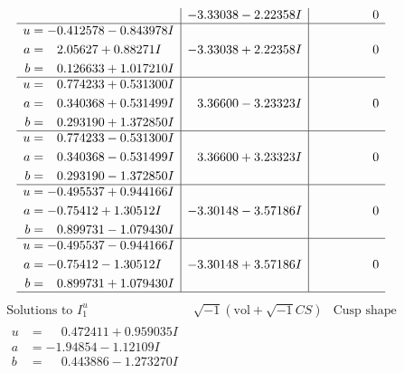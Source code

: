 \documentclass[1p]{elsarticle_modified}
\theoremstyle{definition}
\newcommand{\I}{\sqrt{-1}}
\begin{document}
$$\begin{array}{c|c|c}
 & -3.33038 - 2.22358 I & \phantom{-0.000000 } 0 \\ \hline\begin{aligned}
u &= -0.412578 - 0.843978 I \\
a &= \phantom{-}2.05627 + 0.88271 I \\
b &= \phantom{-}0.126633 + 1.017210 I\end{aligned}
 & -3.33038 + 2.22358 I & \phantom{-0.000000 } 0 \\ \hline\begin{aligned}
u &= \phantom{-}0.774233 + 0.531300 I \\
a &= \phantom{-}0.340368 + 0.531499 I \\
b &= \phantom{-}0.293190 + 1.372850 I\end{aligned}
 & \phantom{-}3.36600 - 3.23323 I & \phantom{-0.000000 } 0 \\ \hline\begin{aligned}
u &= \phantom{-}0.774233 - 0.531300 I \\
a &= \phantom{-}0.340368 - 0.531499 I \\
b &= \phantom{-}0.293190 - 1.372850 I\end{aligned}
 & \phantom{-}3.36600 + 3.23323 I & \phantom{-0.000000 } 0 \\ \hline\begin{aligned}
u &= -0.495537 + 0.944166 I \\
a &= -0.75412 + 1.30512 I \\
b &= \phantom{-}0.899731 - 1.079430 I\end{aligned}
 & -3.30148 - 3.57186 I & \phantom{-0.000000 } 0 \\ \hline\begin{aligned}
u &= -0.495537 - 0.944166 I \\
a &= -0.75412 - 1.30512 I \\
b &= \phantom{-}0.899731 + 1.079430 I\end{aligned}
 & -3.30148 + 3.57186 I & \phantom{-0.000000 } 0\\
 \hline 
 \end{array}$$\newpage$$\begin{array}{c|c|c}  
\text{Solutions to }I^u_{1}& \I (\text{vol} + \sqrt{-1}CS) & \text{Cusp shape}\\
 \hline 
\begin{aligned}
u &= \phantom{-}0.472411 + 0.959035 I \\
a &= -1.94854 - 1.12109 I \\
b &= \phantom{-}0.443886 - 1.273270 I\end{aligned}

\end{array}$$
\end{document}

